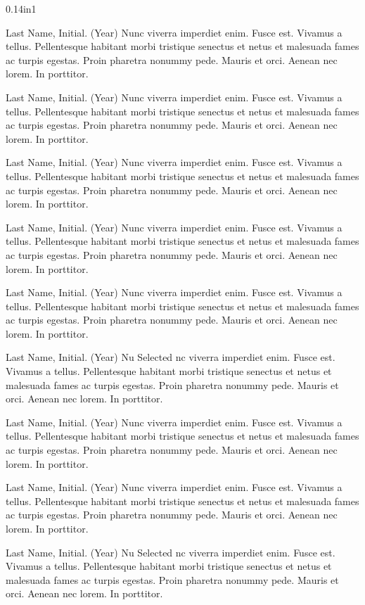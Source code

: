 \documentclass[10pt]{article}
\begin{document}
\begin{hangparas}{0.14in}{1}

Last Name, Initial. (Year) Nunc viverra imperdiet enim. Fusce est. Vivamus a tellus. Pellentesque habitant morbi tristique senectus et netus et malesuada fames ac turpis egestas. Proin pharetra nonummy pede. Mauris et orci. Aenean nec lorem. In porttitor. 

Last Name, Initial. (Year) Nunc viverra imperdiet enim. Fusce est. Vivamus a tellus. Pellentesque habitant morbi tristique senectus et netus et malesuada fames ac turpis egestas. Proin pharetra nonummy pede. Mauris et orci. Aenean nec lorem. In porttitor. 

Last Name, Initial. (Year) Nunc viverra imperdiet enim. Fusce est. Vivamus a tellus. Pellentesque habitant morbi tristique senectus et netus et malesuada fames ac turpis egestas. Proin pharetra nonummy pede. Mauris et orci. Aenean nec lorem. In porttitor. 

Last Name, Initial. (Year) Nunc viverra imperdiet enim. Fusce est. Vivamus a tellus. Pellentesque habitant morbi tristique senectus et netus et malesuada fames ac turpis egestas. Proin pharetra nonummy pede. Mauris et orci. Aenean nec lorem. In porttitor. 

Last Name, Initial. (Year) Nunc viverra imperdiet enim. Fusce est. Vivamus a tellus. Pellentesque habitant morbi tristique senectus et netus et malesuada fames ac turpis egestas. Proin pharetra nonummy pede. Mauris et orci. Aenean nec lorem. In porttitor. 

Last Name, Initial. (Year) Nu Selected nc viverra imperdiet enim. Fusce est. Vivamus a tellus. Pellentesque habitant morbi tristique senectus et netus et malesuada fames ac turpis egestas. Proin pharetra nonummy pede. Mauris et orci. Aenean nec lorem. In porttitor. 

Last Name, Initial. (Year) Nunc viverra imperdiet enim. Fusce est. Vivamus a tellus. Pellentesque habitant morbi tristique senectus et netus et malesuada fames ac turpis egestas. Proin pharetra nonummy pede. Mauris et orci. Aenean nec lorem. In porttitor. 

Last Name, Initial. (Year) Nunc viverra imperdiet enim. Fusce est. Vivamus a tellus. Pellentesque habitant morbi tristique senectus et netus et malesuada fames ac turpis egestas. Proin pharetra nonummy pede. Mauris et orci. Aenean nec lorem. In porttitor. 

Last Name, Initial. (Year) Nu Selected nc viverra imperdiet enim. Fusce est. Vivamus a tellus. Pellentesque habitant morbi tristique senectus et netus et malesuada fames ac turpis egestas. Proin pharetra nonummy pede. Mauris et orci. Aenean nec lorem. In porttitor. 


\end{hangparas}
\end{document}
